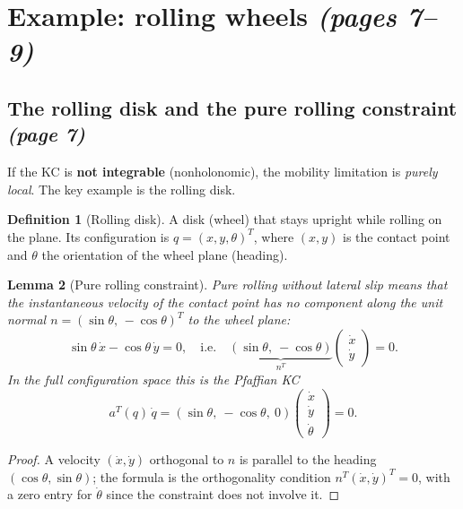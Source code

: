 \documentclass[11pt,a4paper]{article}
\theoremstyle{definition}
\newtheorem{definition}{Definition}[section]
\theoremstyle{plain}
\newtheorem{lemma}[definition]{Lemma}
\begin{document}
\section{Example: rolling wheels \emph{(pages 7--9)}}
 
\subsection{The rolling disk and the pure rolling constraint \emph{(page 7)}}
 
If the KC is \textbf{not integrable} (nonholonomic), the mobility limitation is \emph{purely local}. The key example is the rolling disk.
 
\begin{definition}[Rolling disk]
A disk (wheel) that stays upright while rolling on the plane. Its configuration is $q=(x,y,\theta)^{T}$, where $(x,y)$ is the contact point and $\theta$ the orientation of the wheel plane (heading).
\end{definition}
 
\begin{lemma}[Pure rolling constraint]
Pure rolling without lateral slip means that the instantaneous velocity of the contact point has no component along the unit normal $n=(\sin\theta,\,-\cos\theta)^{T}$ to the wheel plane:
\[
\sin\theta\,\dot x-\cos\theta\,\dot y=0,
\quad\text{i.e.}\quad
\underbrace{(\sin\theta,\ -\cos\theta)}_{n^{T}}\begin{pmatrix}\dot x\\ \dot y\end{pmatrix}=0 .
\]
In the full configuration space this is the Pfaffian KC
\[
a^{T}(q)\,\dot q=(\sin\theta,\ -\cos\theta,\ 0)\begin{pmatrix}\dot x\\ \dot y\\ \dot\theta\end{pmatrix}=0 .
\]
\end{lemma}
\begin{proof}
A velocity $(\dot x,\dot y)$ orthogonal to $n$ is parallel to the heading $(\cos\theta,\sin\theta)$; the formula is the orthogonality condition $n^{T}(\dot x,\dot y)^{T}=0$, with a zero entry for $\dot\theta$ since the constraint does not involve it.
\end{proof}
 
\end{document}
